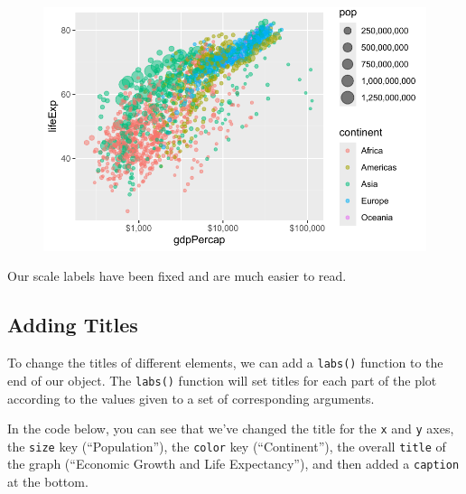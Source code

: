 \documentclass[
  letterpaper,
]{book}
\begin{document}
\begin{figure}[H]

{\centering \includegraphics{visualizing-with-ggplot_files/figure-pdf/unnamed-chunk-24-1.pdf}

}

\end{figure}

Our scale labels have been fixed and are much easier to read.

\hypertarget{adding-titles}{%
\subsection{Adding Titles}\label{adding-titles}}

To change the titles of different elements, we can add a \texttt{labs()}
function to the end of our object. The \texttt{labs()} function will set
titles for each part of the plot according to the values given to a set
of corresponding arguments.

In the code below, you can see that we've changed the title for the
\texttt{x} and \texttt{y} axes, the \texttt{size} key (``Population''),
the \texttt{color} key (``Continent''), the overall \texttt{title} of
the graph (``Economic Growth and Life Expectancy''), and then added a
\texttt{caption} at the bottom.
\end{document}
